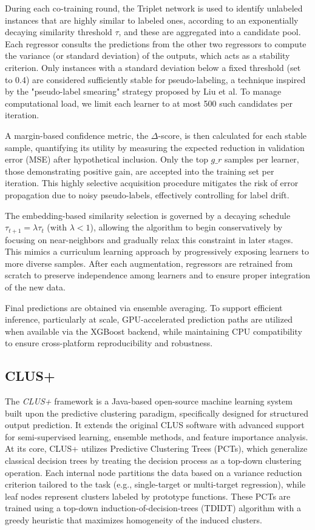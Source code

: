 During each co-training round, the Triplet network is used to identify unlabeled instances that are highly similar to labeled ones, according to an exponentially decaying similarity threshold $\tau$, and these are aggregated into a candidate pool. Each regressor consults the predictions from the other two regressors to compute the variance (or standard deviation) of the outputs, which acts as a stability criterion. Only instances with a standard deviation below a fixed threshold (set to 0.4) are considered sufficiently stable for pseudo-labeling, a technique inspired by the "pseudo-label smearing" strategy proposed by Liu et al. To manage computational load, we limit each learner to at most 500 such candidates per iteration.

A margin-based confidence metric, the $\Delta$-score, is then calculated for each stable sample, quantifying its utility by measuring the expected reduction in validation error (MSE) after hypothetical inclusion. Only the top $g\_r$ samples per learner, those demonstrating positive gain, are accepted into the training set per iteration. This highly selective acquisition procedure mitigates the risk of error propagation due to noisy pseudo-labels, effectively controlling for label drift.

The embedding-based similarity selection is governed by a decaying schedule $\tau_{t+1} = \lambda \tau_t$ (with $\lambda < 1$), allowing the algorithm to begin conservatively by focusing on near-neighbors and gradually relax this constraint in later stages. This mimics a curriculum learning approach by progressively exposing learners to more diverse samples. After each augmentation, regressors are retrained from scratch to preserve independence among learners and to ensure proper integration of the new data.

Final predictions are obtained via ensemble averaging. To support efficient inference, particularly at scale, GPU-accelerated prediction paths are utilized when available via the XGBoost backend, while maintaining CPU compatibility to ensure cross-platform reproducibility and robustness.


\subsection{CLUS+}

The \textit{CLUS+} framework \cite{petkovic2023clusplus} is a Java-based open-source machine learning system built upon the predictive clustering paradigm, specifically designed for structured output prediction. It extends the original CLUS software with advanced support for semi-supervised learning, ensemble methods, and feature importance analysis. At its core, CLUS+ utilizes Predictive Clustering Trees (PCTs), which generalize classical decision trees by treating the decision process as a top-down clustering operation. Each internal node partitions the data based on a variance reduction criterion tailored to the task (e.g., single-target or multi-target regression), while leaf nodes represent clusters labeled by prototype functions. These PCTs are trained using a top-down induction-of-decision-trees (TDIDT) algorithm with a greedy heuristic that maximizes homogeneity of the induced clusters.

